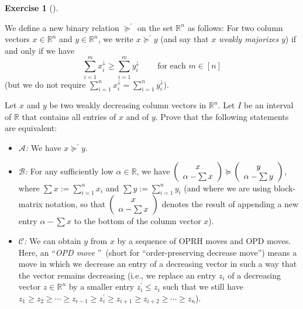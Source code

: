 \documentclass[numbers=enddot,12pt,final,onecolumn,notitlepage]{scrartcl}%
\newcounter{exer}
\numberwithin{exer}{subsection}
\theoremstyle{definition}
\newtheorem{exmp}[exer]{Exercise}
\newenvironment{exercise}[1][]
{\begin{exmp}[#1]\begin{leftbar}}
{\end{leftbar}\end{exmp}}
\let\sumnonlimits\sum
\renewcommand{\sum}{\sumnonlimits\limits}
\begin{document}
\begin{exercise}
\label{exe.major.weakmaj} We define a new binary relation
$\succcurlyeq^{\prime}$ on the set $\mathbb{R}^{n}$ as follows: For two column
vectors $x\in\mathbb{R}^{n}$ and $y\in\mathbb{R}^{n}$, we write $x\succcurlyeq
^{\prime}y$ (and say that $x$ \emph{weakly majorizes} $y$) if and only if we
have%
\[
\sum_{i=1}^{m}x_{i}^{\downarrow}\geq\sum_{i=1}^{m}y_{i}^{\downarrow
}\ \ \ \ \ \ \ \ \ \ \text{for each }m\in\left[  n\right]
\]
(but we do not require $\sum_{i=1}^{n}x_{i}^{\downarrow}=\sum_{i=1}^{n}%
y_{i}^{\downarrow}$).

Let $x$ and $y$ be two weakly decreasing column vectors in $\mathbb{R}^{n}$.
Let $I$ be an interval of $\mathbb{R}$ that contains all entries of $x$ and of
$y$. Prove that the following statements are equivalent:

\begin{itemize}
\item $\mathcal{A}$\textit{:} We have $x\succcurlyeq^{\prime}y$.

\item $\mathcal{B}$\textit{:} For any sufficiently low $\alpha\in\mathbb{R}$,
we have $\left(
\begin{array}
[c]{c}%
x\\
\alpha-\sum x
\end{array}
\right)  \succcurlyeq\left(
\begin{array}
[c]{c}%
y\\
\alpha-\sum y
\end{array}
\right)  $, where $\sum x:=\sum_{i=1}^{n}x_{i}$ and $\sum y:=\sum_{i=1}%
^{n}y_{i}$ (and where we are using block-matrix notation, so that $\left(
\begin{array}
[c]{c}%
x\\
\alpha-\sum x
\end{array}
\right)  $ denotes the result of appending a new entry $\alpha-\sum x$ to the
bottom of the column vector $x$).

\item $\mathcal{C}$\textit{:} We can obtain $y$ from $x$ by a sequence of OPRH
moves and OPD moves. Here, an \textquotedblleft\emph{OPD move}%
\textquotedblright\ (short for \textquotedblleft order-preserving decrease
move\textquotedblright) means a move in which we decrease an entry of a
decreasing vector in such a way that the vector remains decreasing (i.e., we
replace an entry $z_{i}$ of a decreasing vector $z\in\mathbb{R}^{n}$ by a
smaller entry $z_{i}^{\prime}\leq z_{i}$ such that we still have $z_{1}\geq
z_{2}\geq\cdots\geq z_{i-1}\geq z_{i}^{\prime}\geq z_{i+1}\geq z_{i+2}%
\geq\cdots\geq z_{n}$).


\end{itemize}
\end{exercise}
\end{document}
